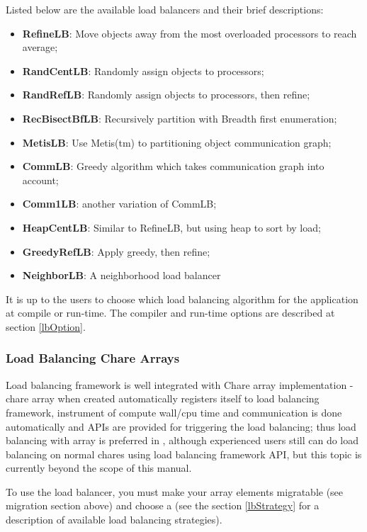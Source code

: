 Listed below are the available load balancers and their brief 
descriptions:
\begin{itemize}
\item {\bf RefineLB}:     Move objects away from the most overloaded processors to reach average;
\item {\bf RandCentLB}:   Randomly assign objects to processors;
\item {\bf RandRefLB}:    Randomly assign objects to processors, then refine;
\item {\bf RecBisectBfLB}:        Recursively partition with Breadth first enumeration;
\item {\bf MetisLB}:      Use Metis(tm) to partitioning object communication graph;
\item {\bf CommLB}:       Greedy algorithm which takes communication graph into account;
\item {\bf Comm1LB}:      another variation of CommLB;
\item {\bf HeapCentLB}:   Similar to RefineLB, but using heap to sort by load;
\item {\bf GreedyRefLB}:  Apply greedy, then refine;
\item {\bf NeighborLB}:   A neighborhood load balancer
\end{itemize}

It is up to the users to choose which load balancing algorithm for the 
application at compile or run-time. The compiler and run-time options 
are described at section \ref{lbOption}.

\subsubsection{Load Balancing Chare Arrays}
\label{lbarray}

Load balancing framework is well integrated with Chare array implementation - 
chare array when created automatically registers itself to load balancing
framework, instrument of compute wall/cpu time and communication is 
done automatically and APIs are provided for triggering the load balancing; 
thus load balancing with array is preferred in \charmpp{}, although 
experienced users still can do load balancing on normal chares using load 
balancing framework API, but this topic is currently beyond the scope of 
this manual.

To use the load balancer, you must make your array elements migratable
(see migration section above) and choose a  
(see the section \ref{lbStrategy} for a description
of available load balancing strategies).

